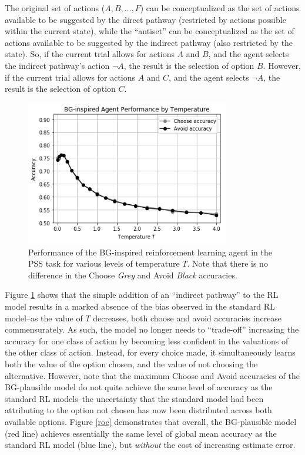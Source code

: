 \documentclass[10pt,letterpaper]{article}
\begin{document}
The original set of actions ($A, B, \dots, F$) can be conceptualized as the set of actions available to be suggested by the direct pathway (restricted by actions possible within the current state), while the ``antiset'' can be conceptualized as the set of actions available to be suggested by the indirect pathway (also restricted by the state). So, if the current trial allows for actions $A$ and $B$, and the agent selects the indirect pathway's action $\neg A$, the result is the selection of option $B$. However, if the current trial allows for actions $A$ and $C$, and the agent selects $\neg A$, the result is the selection of option $C$.

\begin{figure}[ht]
	\begin{center}
		\includegraphics[width=3.5in]{bg-agent-performance.png}
	\end{center}
	\caption{Performance of the BG-inspired reinforcement learning agent in the PSS task for various levels of temperature $T$. Note that there is no difference in the Choose \emph{Grey} and Avoid \emph{Black} accuracies.}
	\label{bg-agents}
\end{figure}

Figure \ref{bg-agents} shows that the simple addition of an ``indirect pathway'' to the RL model results in a marked absence of the bias observed in the standard RL model--as the value of $T$ decreases, both choose and avoid accuracies increase commensurately. As such, the model no longer needs to ``trade-off'' increasing the accuracy for one class of action by becoming less confident in the valuations of the other class of action. Instead, for every choice made, it simultaneously learns both the value of the option chosen, and the value of not choosing the alternative. However, note that the maximum Choose and Avoid accuracies of the BG-plausible model do not quite achieve the same level of accuracy as the standard RL models--the uncertainty that the standard model had been attributing to the option not chosen has now been distributed across both available options.  Figure \ref{roc} demonstrates that overall, the BG-plausible model (red line) achieves essentially the same level of global mean accuracy as the standard RL model (blue line), but \emph{without} the cost of increasing estimate error.  
\end{document}

